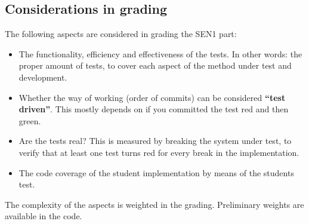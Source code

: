 \subsection{Considerations in grading}
The following aspects are considered in grading the SEN1 part:
\begin{itemize}\itemsep1pt\parskip0pt
\item The functionality, efficiency and effectiveness of the
  tests. In other words: the proper amount of tests, to cover each
  aspect of the method under test and development.
\item Whether the way of working (order of commits) can be considered
  \textbf{``test driven''}. This mostly depends on if you committed
  the test red and then green.
\item Are the tests real? This is measured by breaking the system
  under test, to verify that at least one test turns red for every
  break in the implementation.
\item The code coverage of the student implementation by means of the
  students test.
\end{itemize}

The complexity of the aspects is weighted in the grading. Preliminary
weights are available in the code.
